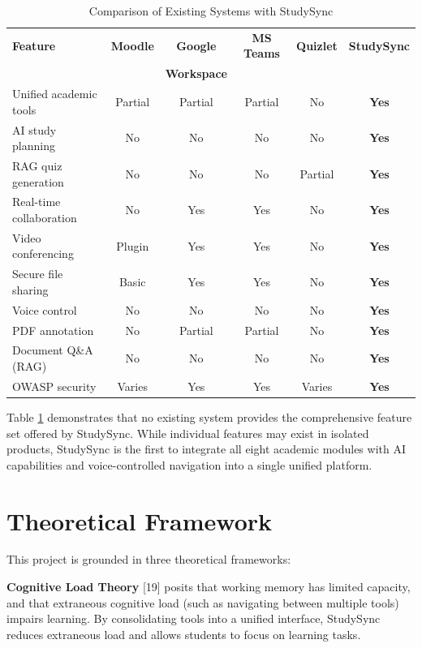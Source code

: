 \documentclass[12pt,a4paper]{report}
\begin{document}
\begin{table}[h]
\centering
\caption{Comparison of Existing Systems with StudySync}
\begin{tabular}{lccccc}
\toprule
\textbf{Feature} & \textbf{Moodle} & \textbf{Google} & \textbf{MS Teams} & \textbf{Quizlet} & \textbf{StudySync} \\
& & \textbf{Workspace} & & & \\
\midrule
Unified academic tools & Partial & Partial & Partial & No & \textbf{Yes} \\
AI study planning & No & No & No & No & \textbf{Yes} \\
RAG quiz generation & No & No & No & Partial & \textbf{Yes} \\
Real-time collaboration & No & Yes & Yes & No & \textbf{Yes} \\
Video conferencing & Plugin & Yes & Yes & No & \textbf{Yes} \\
Secure file sharing & Basic & Yes & Yes & No & \textbf{Yes} \\
Voice control & No & No & No & No & \textbf{Yes} \\
PDF annotation & No & Partial & Partial & No & \textbf{Yes} \\
Document Q\&A (RAG) & No & No & No & No & \textbf{Yes} \\
OWASP security & Varies & Yes & Yes & Varies & \textbf{Yes} \\
\bottomrule
\end{tabular}
\label{tab:comparison}
\end{table}

Table \ref{tab:comparison} demonstrates that no existing system provides the comprehensive feature set offered by StudySync. While individual features may exist in isolated products, StudySync is the first to integrate all eight academic modules with AI capabilities and voice-controlled navigation into a single unified platform.

\section{Theoretical Framework}

This project is grounded in three theoretical frameworks:

\textbf{Cognitive Load Theory} [19] posits that working memory has limited capacity, and that extraneous cognitive load (such as navigating between multiple tools) impairs learning. By consolidating tools into a unified interface, StudySync reduces extraneous load and allows students to focus on learning tasks.
\end{document}
